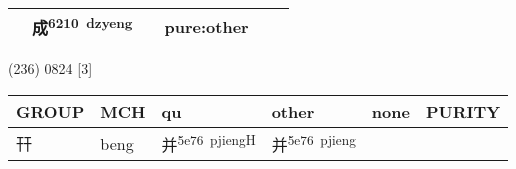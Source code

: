 \documentclass[14pt,a4paper]{scrartcl}
\begin{document}
\begin{longtable}[c]{@{}llllll@{}}
\begin{minipage}[t]{0.14\columnwidth}\raggedright\strut
\strut\end{minipage} &
\begin{minipage}[t]{0.14\columnwidth}\raggedright\strut
成\textsuperscript{6210~dzyeng}
\strut\end{minipage} &
\begin{minipage}[t]{0.14\columnwidth}\raggedright\strut
\strut\end{minipage} &
\begin{minipage}[t]{0.14\columnwidth}\raggedright\strut
pure:other
\strut\end{minipage}\tabularnewline
\bottomrule
\end{longtable}

(236) 0824 {[}3{]}

\begin{longtable}[c]{@{}llllll@{}}
\toprule
\begin{minipage}[b]{0.14\columnwidth}\raggedright\strut
GROUP
\strut\end{minipage} &
\begin{minipage}[b]{0.14\columnwidth}\raggedright\strut
MCH
\strut\end{minipage} &
\begin{minipage}[b]{0.14\columnwidth}\raggedright\strut
qu
\strut\end{minipage} &
\begin{minipage}[b]{0.14\columnwidth}\raggedright\strut
other
\strut\end{minipage} &
\begin{minipage}[b]{0.14\columnwidth}\raggedright\strut
none
\strut\end{minipage} &
\begin{minipage}[b]{0.14\columnwidth}\raggedright\strut
PURITY
\strut\end{minipage}\tabularnewline
\midrule
\endhead
\begin{minipage}[t]{0.14\columnwidth}\raggedright\strut
幵
\strut\end{minipage} &
\begin{minipage}[t]{0.14\columnwidth}\raggedright\strut
beng
\strut\end{minipage} &
\begin{minipage}[t]{0.14\columnwidth}\raggedright\strut
并\textsuperscript{5e76~pjiengH}
\strut\end{minipage} &
\begin{minipage}[t]{0.14\columnwidth}\raggedright\strut
并\textsuperscript{5e76~pjieng}

\end{minipage}
\end{longtable}
\end{document}
